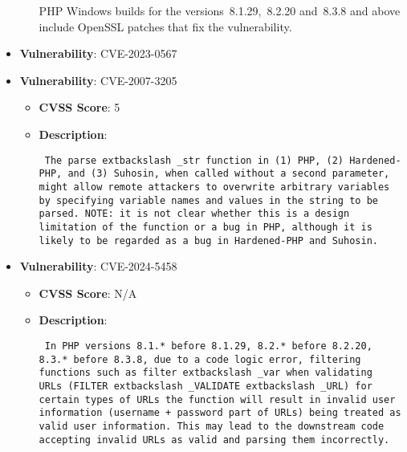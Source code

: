 \documentclass{article}
\begin{document}
\begin{itemize}
\begin{itemize}
{{PHP Windows builds for the versions 8.1.29, 8.2.20 and 8.3.8 and above include OpenSSL patches that fix the vulnerability. }}
        \end{itemize}
    
        \item \textbf{Vulnerability}: CVE-2023-0567
    
        \item \textbf{Vulnerability}: CVE-2007-3205
        \begin{itemize}
            \item \textbf{CVSS Score}:  5 
            \item \textbf{Description}: \parbox{\linewidth}{\texttt{ The parse	extbackslash _str function in (1) PHP, (2) Hardened-PHP, and (3) Suhosin, when called without a second parameter, might allow remote attackers to overwrite arbitrary variables by specifying variable names and values in the string to be parsed.  NOTE: it is not clear whether this is a design limitation of the function or a bug in PHP, although it is likely to be regarded as a bug in Hardened-PHP and Suhosin. }}
        \end{itemize}
    
        \item \textbf{Vulnerability}: CVE-2024-5458
        \begin{itemize}
            \item \textbf{CVSS Score}:  N/A 
            \item \textbf{Description}: \parbox{\linewidth}{\texttt{ In PHP versions 8.1.* before 8.1.29, 8.2.* before 8.2.20, 8.3.* before 8.3.8, due to a code logic error, filtering functions such as filter	extbackslash _var when validating URLs (FILTER	extbackslash _VALIDATE	extbackslash _URL) for certain types of URLs the function will result in invalid user information (username + password part of URLs) being treated as valid user information. This may lead to the downstream code accepting invalid URLs as valid and parsing them incorrectly. }}
        \end{itemize}
    

\end{itemize}
\end{document}

